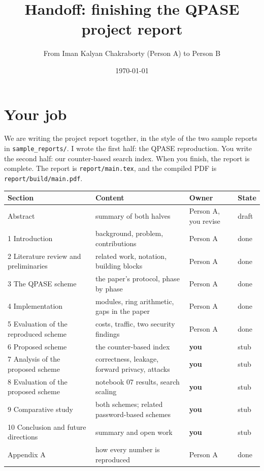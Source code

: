 \documentclass[11pt,a4paper]{article}
\title{\textbf{Handoff: finishing the QPASE project report}}
\author{From Iman Kalyan Chakraborty (Person A) to Person B}
\date{\today}
\newcommand{\file}[1]{\texttt{#1}}
\begin{document}
\maketitle
\raggedright

\section{Your job}

We are writing the project report together, in the style of the two sample reports in \file{sample\_reports/}.
I wrote the first half: the QPASE reproduction. You write the second half: our counter-based search index. When
you finish, the report is complete. The report is \file{report/main.tex}, and the compiled PDF is
\file{report/build/main.pdf}.

\begin{center}
\small
\begin{tabularx}{\linewidth}{lXll}
\toprule
\textbf{Section} & \textbf{Content} & \textbf{Owner} & \textbf{State} \\
\midrule
Abstract & summary of both halves & Person A, you revise & draft \\
1 Introduction & background, problem, contributions & Person A & done \\
2 Literature review and preliminaries & related work, notation, building blocks & Person A & done \\
3 The QPASE scheme & the paper's protocol, phase by phase & Person A & done \\
4 Implementation & modules, ring arithmetic, gaps in the paper & Person A & done \\
5 Evaluation of the reproduced scheme & costs, traffic, two security findings & Person A & done \\
6 Proposed scheme & the counter-based index & \textbf{you} & stub \\
7 Analysis of the proposed scheme & correctness, leakage, forward privacy, attacks & \textbf{you} & stub \\
8 Evaluation of the proposed scheme & notebook 07 results, search scaling & \textbf{you} & stub \\
9 Comparative study & both schemes; related password-based schemes & \textbf{you} & stub \\
10 Conclusion and future directions & summary and open work & \textbf{you} & stub \\
Appendix A & how every number is reproduced & Person A & done \\
\bottomrule
\end{tabularx}
\end{center}
\end{document}
